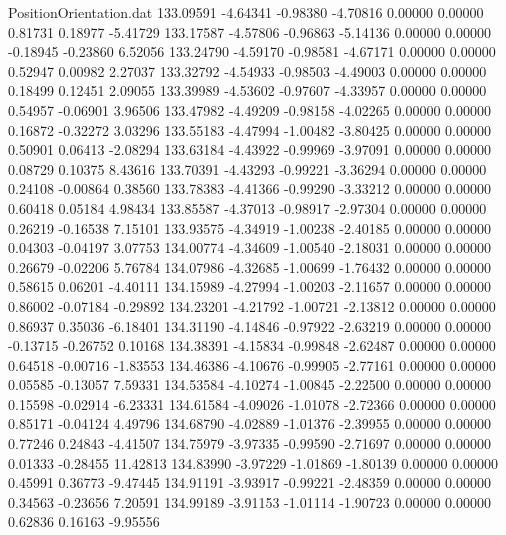 \begin{filecontents}{PositionOrientation.dat}
 133.09591   -4.64341   -0.98380    -4.70816    0.00000    0.00000    0.81731    0.18977   -5.41729
 133.17587   -4.57806   -0.96863    -5.14136    0.00000    0.00000   -0.18945   -0.23860    6.52056
 133.24790   -4.59170   -0.98581    -4.67171    0.00000    0.00000    0.52947    0.00982    2.27037
 133.32792   -4.54933   -0.98503    -4.49003    0.00000    0.00000    0.18499    0.12451    2.09055
 133.39989   -4.53602   -0.97607    -4.33957    0.00000    0.00000    0.54957   -0.06901    3.96506
 133.47982   -4.49209   -0.98158    -4.02265    0.00000    0.00000    0.16872   -0.32272    3.03296
 133.55183   -4.47994   -1.00482    -3.80425    0.00000    0.00000    0.50901    0.06413   -2.08294
 133.63184   -4.43922   -0.99969    -3.97091    0.00000    0.00000    0.08729    0.10375    8.43616
 133.70391   -4.43293   -0.99221    -3.36294    0.00000    0.00000    0.24108   -0.00864    0.38560
 133.78383   -4.41366   -0.99290    -3.33212    0.00000    0.00000    0.60418    0.05184    4.98434
 133.85587   -4.37013   -0.98917    -2.97304    0.00000    0.00000    0.26219   -0.16538    7.15101
 133.93575   -4.34919   -1.00238    -2.40185    0.00000    0.00000    0.04303   -0.04197    3.07753
 134.00774   -4.34609   -1.00540    -2.18031    0.00000    0.00000    0.26679   -0.02206    5.76784
 134.07986   -4.32685   -1.00699    -1.76432    0.00000    0.00000    0.58615    0.06201   -4.40111
 134.15989   -4.27994   -1.00203    -2.11657    0.00000    0.00000    0.86002   -0.07184   -0.29892
 134.23201   -4.21792   -1.00721    -2.13812    0.00000    0.00000    0.86937    0.35036   -6.18401
 134.31190   -4.14846   -0.97922    -2.63219    0.00000    0.00000   -0.13715   -0.26752    0.10168
 134.38391   -4.15834   -0.99848    -2.62487    0.00000    0.00000    0.64518   -0.00716   -1.83553
 134.46386   -4.10676   -0.99905    -2.77161    0.00000    0.00000    0.05585   -0.13057    7.59331
 134.53584   -4.10274   -1.00845    -2.22500    0.00000    0.00000    0.15598   -0.02914   -6.23331
 134.61584   -4.09026   -1.01078    -2.72366    0.00000    0.00000    0.85171   -0.04124    4.49796
 134.68790   -4.02889   -1.01376    -2.39955    0.00000    0.00000    0.77246    0.24843   -4.41507
 134.75979   -3.97335   -0.99590    -2.71697    0.00000    0.00000    0.01333   -0.28455   11.42813
 134.83990   -3.97229   -1.01869    -1.80139    0.00000    0.00000    0.45991    0.36773   -9.47445
 134.91191   -3.93917   -0.99221    -2.48359    0.00000    0.00000    0.34563   -0.23656    7.20591
 134.99189   -3.91153   -1.01114    -1.90723    0.00000    0.00000    0.62836    0.16163   -9.95556

\end{filecontents}
